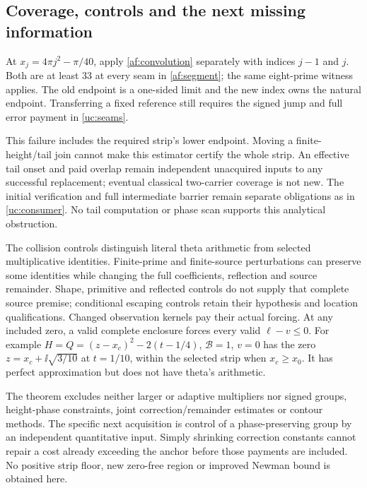 \subsection{Coverage, controls and the next missing information}

At $x_j=4\pi j^2-\pi/40$, apply \eqref{af:convolution} separately
with indices $j-1$ and $j$. Both are at least 33 at every seam in
\eqref{af:segment}; the same eight-prime witness applies.
The old endpoint is a one-sided limit and the new index owns the
natural endpoint. Transferring a fixed reference still requires the
signed jump and full error payment in \eqref{uc:seams}.

This failure includes the required strip's lower endpoint. Moving a
finite-height/tail join cannot make this estimator certify the whole
strip. An effective tail onset and paid overlap remain independent
unacquired inputs to any successful replacement; eventual classical
two-carrier coverage is not new. The initial verification and full
intermediate barrier remain separate obligations as in
\eqref{uc:consumer}. No tail computation or phase scan supports this
analytical obstruction.

The collision controls distinguish literal theta arithmetic from
selected multiplicative identities. Finite-prime and finite-source
perturbations can preserve some identities while changing the full
coefficients, reflection and source remainder. Shape, primitive and
reflected controls do not supply that complete source premise; conditional
escaping controls retain their hypothesis and location qualifications.
Changed observation kernels pay their actual forcing. At any included
zero, a valid complete enclosure forces every valid $\ell-v\le0$.
For example $H=Q=(z-x_c)^2-2(t-1/4)$, $\mathcal B=1$, $v=0$ has
the zero $z=x_c+\ii\sqrt{3/10}$ at $t=1/10$, within the selected
strip when $x_c\ge x_0$. It has perfect approximation but does not
have theta's arithmetic.

The theorem excludes neither larger or adaptive multipliers nor signed
groups, height-phase constraints, joint correction/remainder estimates
or contour methods. The specific next acquisition is control of a
phase-preserving group by an independent quantitative input. Simply
shrinking correction constants cannot repair a cost already exceeding
the anchor before those payments are included. No positive strip floor,
new zero-free region or improved Newman bound is obtained here.
